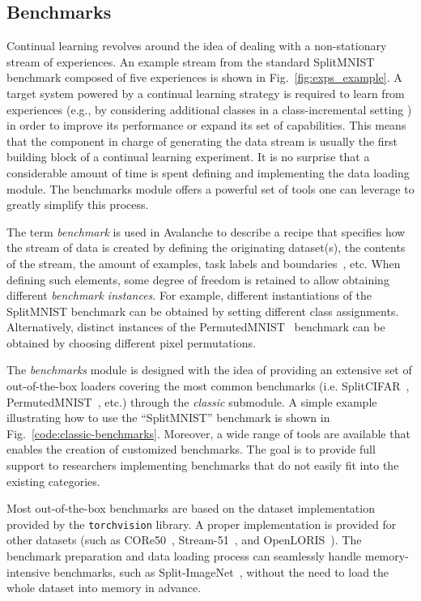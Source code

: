 \documentclass[final]{cvpr}
\theoremstyle{definition}
\newcommand{\codeinline}[1]{\texttt{#1}}
\begin{document}
\subsection{Benchmarks}
\label{sec:benchmarks}

Continual learning revolves around the idea of dealing with a non-stationary stream of experiences. An example stream from the standard SplitMNIST benchmark \cite{zenke2017} composed of five experiences is shown in  Fig.~\ref{fig:exps_example}. A target system powered by a continual learning strategy is required to learn from experiences (e.g., by considering additional classes in a class-incremental setting \cite{masana2020class}) in order to improve its performance or expand its set of capabilities.
This means that the component in charge of generating the data stream is usually the first building block of a continual learning experiment. It is no surprise that a considerable amount of time is spent defining and implementing the data loading module.
The benchmarks module %
offers a powerful set of tools one can leverage to greatly simplify this process.

The term \emph{benchmark} is used in Avalanche to describe a recipe that specifies how the stream of data is created by defining the originating dataset(s), the contents of the stream, the amount of examples, task labels and boundaries~\cite{aljundi2019d}, etc. When defining such elements, some degree of freedom is retained to allow obtaining different \emph{benchmark instances}. For example, different instantiations of the SplitMNIST benchmark \cite{zenke2017} can be obtained by setting different class assignments. Alternatively, distinct instances of the PermutedMNIST~\cite{goodfellow2013empirical} benchmark can be obtained by choosing different pixel permutations.

The \emph{benchmarks} module is designed with the idea of providing an extensive set of out-of-the-box loaders covering the most common benchmarks (i.e. SplitCIFAR~\cite{rebuffi2017}, PermutedMNIST~\cite{goodfellow2013empirical}, etc.) through the \emph{classic} submodule. A simple example illustrating how to use the “SplitMNIST” benchmark \cite{zenke2017} is shown in Fig.~\ref{code:classic-benchmarks}.
Moreover, a wide range of tools are available that enables the creation of customized benchmarks. The goal is to provide full support to researchers implementing benchmarks that do not easily fit into the existing categories.

Most out-of-the-box benchmarks are based on the dataset implementation provided by the \codeinline{torchvision} library. A proper implementation is provided for other datasets (such as CORe50~\cite{lomonaco2017}, Stream-51~\cite{roady2020stream}, and OpenLORIS~\cite{she2019}). The benchmark preparation and data loading process can seamlessly handle memory-intensive benchmarks, such as Split-ImageNet~\cite{rebuffi2017}, without the need to load the whole dataset into memory in advance.
\end{document}
